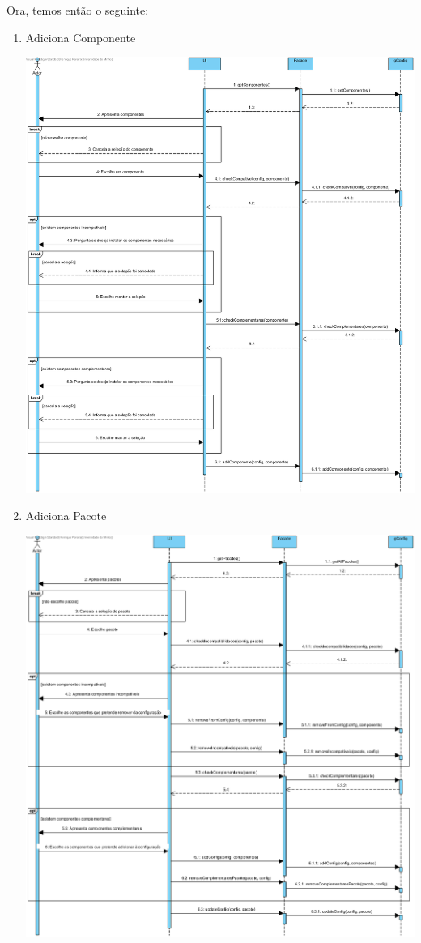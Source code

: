 \documentclass[11pt]{article} %
\begin{document}
Ora, temos então o seguinte:
\begin{enumerate}
	\item Adiciona Componente
		\begin{center}
 			\includegraphics[width = 6in]{dsss_adiciona_componente.png}
		\end{center}
	\item Adiciona Pacote
		\begin{center}
 			\includegraphics[width = 6in]{dsss_adiciona_pacote.png}

\end{center}
\end{enumerate}
\end{document}
